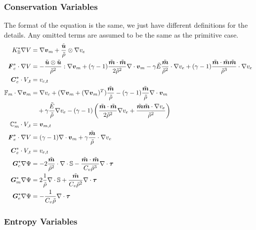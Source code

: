 \documentclass{article}
\begin{document}

\subsubsection*{Conservation Variables}
The format of the equation is the same, we just have different definitions for the details.
Any omitted terms are assumed to be the same as the primitive case.
\begin{align*}
K_\mathbb{D}^*\Grad V&=\Grad\bfv_m+\frac{\tilde\bfu}{\tilde\rho}\otimes\Grad v_e\\
\bfF_c^*\cdot\Grad V&=
-\frac{\tilde\bfu\otimes\tilde\bfu}{\tilde\rho^2}:\Grad\bfv_m+(\gamma-1)\frac{\tilde\bfm\cdot\tilde\bfm}{2\tilde\rho^2}\Div\bfv_m
-\gamma\tilde E\frac{\tilde\bfm}{\tilde\rho^2}\cdot\Grad v_e+(\gamma-1)\frac{\tilde\bfm\cdot\tilde\bfm\tilde\bfm}{\tilde\rho^3}\cdot\Grad v_e
\\
%
\bfC_c^*\cdot V_{,t}&=v_{c,t}\\
%
\mathbb{F}_m\cdot\Grad\bfv_m&=\Grad v_c
+(\Grad\bfv_m+(\Grad\bfv_m)^T)\frac{\tilde\bfm}{\tilde\rho}-(\gamma-1)\frac{\tilde\bfm}{\tilde\rho}\Div\bfv_m\\
&\quad+\gamma\frac{\tilde E}{\tilde\rho}\Grad v_e
-(\gamma-1)\LRp{\frac{\tilde\bfm\cdot\tilde\bfm}{2\tilde\rho^2}\Grad v_e+\frac{\tilde\bfm\tilde\bfm\cdot\Grad v_e}{\tilde\rho^2}}
\\
%
\mathbb{C}_m^*\cdot V_{,t}&=\bfv_{m,t}\\
%
\bfF_e^*\cdot\Grad V&=(\gamma-1)\Div\bfv_m+\gamma\frac{\tilde\bfm}{\tilde\rho}\cdot\Grad v_e
\\
%
\bfC_e^*\cdot V_{,t}&=v_{e,t}\\
%
\bfG_c^*\Grad\Psi&=-2\frac{\tilde\bfm}{\tilde\rho^2}\cdot\Div\mathbb{S}
-\frac{\tilde\bfm\cdot\tilde\bfm}{C_v\tilde\rho^3}\Div\bftau
\\
%
\bfG_m^*\Grad\Psi&=2\frac{1}{\tilde\rho}\Div\mathbb{S}
+\frac{\tilde\bfm}{C_v\tilde\rho^2}\Div\bftau
\\
%
\bfG_e^*\Grad\Psi&=-\frac{1}{C_v\tilde\rho}\Div\bftau
\end{align*}

\subsubsection*{Entropy Variables}
\end{document}
